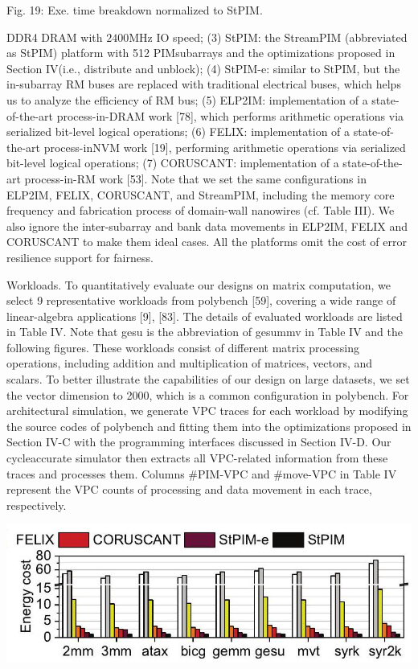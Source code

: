 \documentclass[10pt]{article}
\begin{document}
Fig. 19: Exe. time breakdown normalized to StPIM.

DDR4 DRAM with $2400 \mathrm{MHz}$ IO speed; (3) StPIM: the StreamPIM (abbreviated as StPIM) platform with 512 PIMsubarrays and the optimizations proposed in Section IV(i.e., distribute and unblock); (4) StPIM-e: similar to StPIM, but the in-subarray RM buses are replaced with traditional electrical buses, which helps us to analyze the efficiency of RM bus; (5) ELP2IM: implementation of a state-of-the-art process-in-DRAM work [78], which performs arithmetic operations via serialized bit-level logical operations; (6) FELIX: implementation of a state-of-the-art process-inNVM work [19], performing arithmetic operations via serialized bit-level logical operations; (7) CORUSCANT: implementation of a state-of-the-art process-in-RM work [53]. Note that we set the same configurations in ELP2IM, FELIX, CORUSCANT, and StreamPIM, including the memory core frequency and fabrication process of domain-wall nanowires (cf. Table III). We also ignore the inter-subarray and bank data movements in ELP2IM, FELIX and CORUSCANT to make them ideal cases. All the platforms omit the cost of error resilience support for fairness.

Workloads. To quantitatively evaluate our designs on matrix computation, we select 9 representative workloads from polybench [59], covering a wide range of linear-algebra applications [9], [83]. The details of evaluated workloads are listed in Table IV. Note that gesu is the abbreviation of gesummv in Table IV and the following figures. These workloads consist of different matrix processing operations, including addition and multiplication of matrices, vectors, and scalars. To better illustrate the capabilities of our design on large datasets, we set the vector dimension to 2000, which is a common configuration in polybench. For architectural simulation, we generate VPC traces for each workload by modifying the source codes of polybench and fitting them into the optimizations proposed in Section IV-C with the programming interfaces discussed in Section IV-D. Our cycleaccurate simulator then extracts all VPC-related information from these traces and processes them. Columns \#PIM-VPC and \#move-VPC in Table IV represent the VPC counts of processing and data movement in each trace, respectively.

\begin{center}
\includegraphics[max width=\textwidth]{2024_05_12_abeba8a85da5b5ec4c7bg-10}
\end{center}
\end{document}
